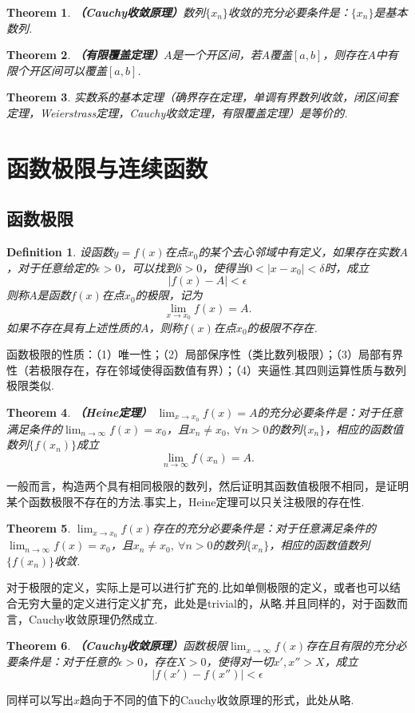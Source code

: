 \documentclass[9pt]{ctexart}
\newtheorem{definition}{Definition}[section]
\newtheorem{theorem}{Theorem}[section]
\begin{document}
\begin{theorem}
    \textbf{（Cauchy收敛原理）}数列$\{x_n\}$收敛的充分必要条件是：$\{x_n\}$是基本数列.
\end{theorem}

\begin{theorem}
    \textbf{（有限覆盖定理）}$A$是一个开区间，若$A$覆盖$[a,b]$，则存在$A$中有限个开区间可以覆盖$[a,b]$.
\end{theorem}
\begin{theorem}
    实数系的基本定理（确界存在定理，单调有界数列收敛，闭区间套定理，Weierstrass定理，Cauchy收敛定理，有限覆盖定理）是等价的.
\end{theorem}


\section{函数极限与连续函数}
\subsection{函数极限}
\begin{definition}
    设函数$y=f(x)$在点$x_0$的某个去心邻域中有定义，如果存在实数$A$，对于任意给定的$\epsilon>0$，可以找到$\delta>0$，使得当$0<|x-x_0|<\delta$时，成立
    \[|f(x)-A|<\epsilon\]
    则称$A$是函数$f(x)$在点$x_0$的极限，记为
    \[\lim_{x\to x_0}f(x)=A.\]
    如果不存在具有上述性质的$A$，则称$f(x)$在点$x_0$的极限不存在.
\end{definition}
\par{函数极限的性质：（1）唯一性；（2）局部保序性（类比数列极限）；（3）局部有界性（若极限存在，存在邻域使得函数值有界）；（4）夹逼性.其四则运算性质与数列极限类似.}

\begin{theorem}
    \textbf{（Heine定理）} $\lim_{x\to x_0}f(x)=A$的充分必要条件是：对于任意满足条件的$\lim_{n\to\infty}f(x)=x_0$，且$x_n\neq x_0,\ \forall n>0$的数列$\{x_n\}$，相应的函数值数列$\{f(x_n)\}$成立
    \[\lim_{n\to\infty}f(x_n)=A.\]
\end{theorem}
\par{一般而言，构造两个具有相同极限的数列，然后证明其函数值极限不相同，是证明某个函数极限不存在的方法.事实上，Heine定理可以只关注极限的存在性.}
\begin{theorem}
    $\lim_{x\to x_0}f(x)$存在的充分必要条件是：对于任意满足条件的$\lim_{n\to\infty}f(x)=x_0$，且$x_n\neq x_0,\ \forall n>0$的数列$\{x_n\}$，相应的函数值数列$\{f(x_n)\}$收敛.
\end{theorem}
\par{对于极限的定义，实际上是可以进行扩充的.比如单侧极限的定义，或者也可以结合无穷大量的定义进行定义扩充，此处是trivial的，从略.并且同样的，对于函数而言，Cauchy收敛原理仍然成立.}
\begin{theorem}
    \textbf{（Cauchy收敛原理）}函数极限$\lim_{x\to\infty}f(x)$存在且有限的充分必要条件是：对于任意的$\epsilon>0$，存在$X>0$，使得对一切$x',x''>X$，成立
    \[|f(x')-f(x'')|<\epsilon\]
\end{theorem}
\par{同样可以写出$x$趋向于不同的值下的Cauchy收敛原理的形式，此处从略.}
\end{document}
